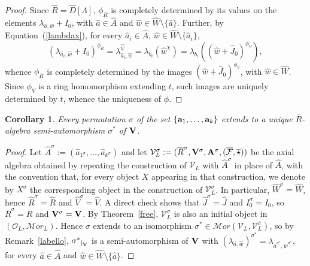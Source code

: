 \documentclass[a4paper]{amsart}
\newtheorem{cor}[lemma]{Corollary}
\newcommand{\Amo}{{\mathcal {\bf A}}}
\newcommand{\A}{ {\hat A}}
\newcommand{\Ro}{{\overline R}}
\newcommand{\Vo}{{\bf V}}
\newcommand{\aR}{{\hat R}}
\newcommand{\hW}{{\hat W}}
\newcommand{\hJ}{{\hat J}}
\newcommand{\ha}{{\hat a}}
\newcommand{\hw}{{\hat w}}
\newcommand{\ba}{{\bf a}}
\begin{document}
\begin{proof}
Since $\aR=\hat D[\Lambda]$, $\phi_R$ is completely determined by its values on the elements $\lambda_{\ha,\hw}+I_0$, with $\ha\in \A$ and $\hw\in \hW\setminus \{\ha\}$. Further, by Equation~(\ref{lambdax}), for every $\ha_i\in \A$, $\hw\in \hW\setminus \{\ha_i\}$, 
\begin{equation}\label{bendef}
(\lambda_{\ha_i,\hw}+I_0)^{\phi_R}=\lambda_{\ha_i,\hw}^{\hat\psi}=\lambda_{b_i}(\hw^\chi)=\lambda_{b_i}((\hw+\hJ_0)^{\phi_{V}}),
\end{equation}
whence  $\phi_R$ is completely determined by the images $(\hw+\hJ_0)^{\phi_{V}}$, with $\hw \in \hW$.  Since $\phi_{V}$ is a ring homomorphism extending $t$, such images are uniquely determined by $t$, whence the uniqueness of  $\phi$. 
\end{proof}



\begin{cor}\label{baruf}
Every  permutation $\sigma $ of the set $\{\ba_1,\dots , \ba_k\}$ extends to a unique $\Ro$-algebra semi-automorphism $\sigma^\ast$ of $\Vo$. 
\end{cor}
\begin{proof}
Let $\A^\sigma:=(\ha_{1^\sigma}, \ldots , \ha_{k^\sigma})$ and let ${\mathcal V}_L^\sigma:=(\Ro^\sigma,\Vo^\sigma, \Amo^\sigma, (\overline{\mathcal F}, \overline \star))$ be the axial algebra obtained by repeating the construction of $\mathcal V_L$ with $\A^\sigma$ in place of $\A$, with the convention that, for every object $X$ appearing in that construction, we denote by $X^\sigma$ the corresponding object in the construction of  ${\mathcal V}_L^\sigma$. In particular, 
 $\hW^\sigma=\hW$, hence $\hat R^\sigma=\hat R$ and $\hat V^\sigma=\hat V$. A direct check shows that $\hJ^\sigma=\hJ$ and $I_0^\sigma=I_0$, so 
$\Ro^\sigma=\Ro$ and $\Vo^\sigma=\Vo$.  By Theorem~\ref{free}, ${\mathcal V}_L^\sigma$ is also an initial object in $(\mathcal O_L, \mathcal Mor_L)$.  Hence $\sigma$ extends to an isomorphism $\sigma^\ast\in \mathcal Mor({\mathcal V}_L, {\mathcal V}_L^\sigma)$, so by Remark~\ref{labello}, ${\sigma^\ast}_{|_\Vo}$ is a  semi-automorphism of $\Vo$ with $(\lambda_{\ha,\hw})^{\sigma^\ast}=\lambda_{\ha^{\sigma^\ast}, \hw^{\sigma^\ast}}$, for every $\ha\in \A$ and $\hw\in \hW\setminus \{\ha\}$.
\end{proof}


\end{document}
